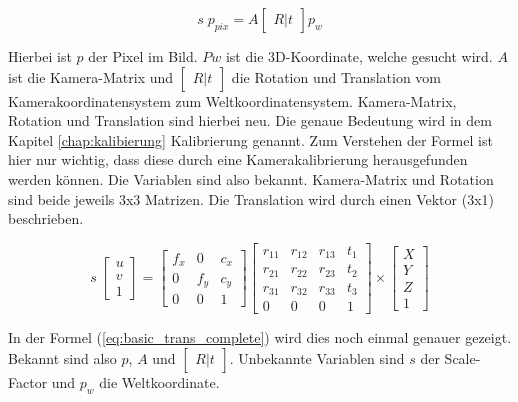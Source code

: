 	\begin{equation}
		s \; p_{pix} = A \begin{bmatrix} R|t \end{bmatrix} p_w
		\label{eq:basic_trans}
	\end{equation}
	
	Hierbei ist \( p \) der Pixel im Bild. \( Pw \) ist die 3D-Koordinate, welche gesucht wird. \( A \) ist die Kamera-Matrix und \( \begin{bmatrix} R|t \end{bmatrix} \) die Rotation und Translation vom Kamerakoordinatensystem zum Weltkoordinatensystem. Kamera-Matrix, Rotation und Translation sind hierbei neu. Die genaue Bedeutung wird in dem Kapitel \ref{chap:kalibierung} Kalibrierung genannt. Zum Verstehen der Formel ist hier nur wichtig, dass diese durch eine Kamerakalibrierung herausgefunden werden können. Die Variablen sind also bekannt. Kamera-Matrix und Rotation sind beide jeweils 3x3 Matrizen. Die Translation wird durch einen Vektor (3x1) beschrieben. 
	
	\begin{equation}
		s \; \begin{bmatrix}
		u \\ 
		v \\ 
		1
		\end{bmatrix} = \begin{bmatrix}
		f_x & 0 & c_x \\
		0 & f_y & c_y \\
		0 & 0 & 1
		\end{bmatrix} \begin{bmatrix}
		r_{11} & r_{12} & r_{13} & t_1 \\ 
		r_{21} & r_{22} & r_{23} & t_2 \\ 
		r_{31} & r_{32} & r_{33} & t_3 \\
		0 & 0 & 0 & 1
		\end{bmatrix} \times \begin{bmatrix}
		X \\ 
		Y \\ 
		Z \\
		1
		\end{bmatrix}
		\label{eq:basic_trans_complete}
	\end{equation}
	
	In der Formel (\ref{eq:basic_trans_complete}) wird dies noch einmal genauer gezeigt. Bekannt sind also \( p \), \( A \) und \( \begin{bmatrix} R|t \end{bmatrix} \). Unbekannte Variablen sind \( s \) der Scale-Factor und \( p_w \) die Weltkoordinate.
	

